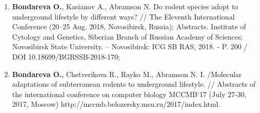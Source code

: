 \begin{small}
\begin{enumerate}
\item[\textbullet] \textbf{Bondareva O.}, Kasianov A., Abramson N. Do rodent species adopt to underground lifestyle by different ways? // The Eleventh International Conference (20–25 Aug. 2018, Novosibirsk, Russia); Abstracts. Institute of Cytology and Genetics, Siberian Branch of Russian Academy of Sciences; Novosibirsk State University. – Novosibirsk: ICG SB RAS, 2018. - P. 200 / DOI 10.18699/BGRSSB-2018-170;

\item[\textbullet] \textbf{Bondareva O.}, Chetverikova R., Rayko M., Abramson N. I. /Molecular adaptations of subterranean rodents to underground lifestyle. //  Abstracts of the international conference on computer biology MCCMB`17 (July 27-30, 2017, Moscow) http://mccmb.belozersky.msu.ru/2017/index.html.

\end{enumerate}


\end{small}
